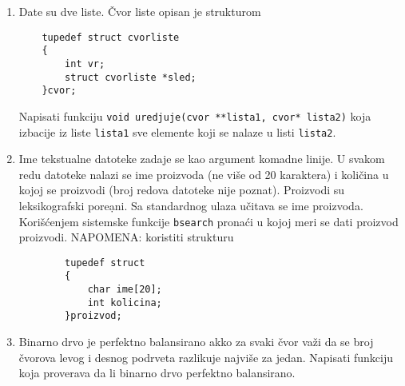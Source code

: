 \begin{enumerate}
\item Date su dve liste. \v Cvor liste opisan je strukturom
\begin{verbatim}
    tupedef struct cvorliste
    {
        int vr;
        struct cvorliste *sled;
    }cvor;
\end{verbatim}

  Napisati funkciju \verb|void uredjuje(cvor **lista1, cvor* lista2)|
  koja izbacije iz liste \verb|lista1| sve elemente koji se nalaze
  u listi \verb|lista2|.

\item Ime tekstualne datoteke zadaje se kao argument komadne linije.
      U svakom redu datoteke nalazi se ime proizvoda (ne vi\v se od 20 karaktera)
      i koli\v cina u kojoj se proizvodi (broj redova datoteke nije poznat). Proizvodi su
      leksikografski pore\d ani. Sa standardnog ulaza u\v citava se ime proizvoda. Kori\v s\' cenjem
      sistemske funkcije \verb|bsearch| prona\' ci u kojoj meri se dati proizvod proizvodi.
      NAPOMENA: koristiti strukturu

\begin{verbatim}
        tupedef struct
        {
            char ime[20];
            int kolicina;
        }proizvod;
\end{verbatim}

\item Binarno drvo je perfektno balansirano akko za svaki \v cvor va\v zi da se broj \v cvorova levog
      i desnog podrveta razlikuje najvi\v se za jedan. Napisati funkciju koja proverava da li binarno drvo
      perfektno balansirano.
\end{enumerate}

